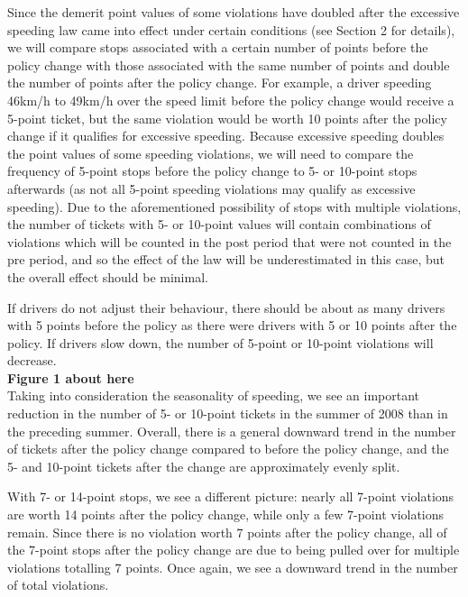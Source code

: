 Since the demerit point values of some violations have doubled after the excessive speeding law came into effect under certain conditions (see Section 2 for details), we will compare stops associated with a certain number of points before the policy change with those associated with the same number of points and double the number of points after the policy change. For example, a driver speeding 46km/h to 49km/h over the speed limit before the policy change would receive a 5-point ticket, but the same violation would be worth 10 points after the policy change if it qualifies for excessive speeding. Because excessive speeding doubles the point values of some speeding violations, we will need to compare the frequency of 5-point stops before the policy change to 5- or 10-point stops afterwards (as not all 5-point speeding violations may qualify as excessive speeding). Due to the aforementioned possibility of stops with multiple violations, the number of tickets with 5- or 10-point values will contain combinations of violations which will be counted in the post period that were not counted in the pre period, and so the effect of the law will be underestimated in this case, but the overall effect should be minimal.

If drivers do not adjust their behaviour, there should be about as many drivers with 5 points before the policy as there were drivers with 5 or 10 points after the policy. If drivers slow down, the number of 5-point or 10-point violations will decrease. \\

\textbf{Figure 1 about here} \\

Taking into consideration the seasonality of speeding, we see an important reduction in the number of 5- or 10-point tickets in the summer of 2008 than in the preceding summer. Overall, there is a general downward trend in the number of tickets after the policy change compared to before the policy change, and the 5- and 10-point tickets after the change are approximately evenly split. 

With 7- or 14-point stops, we see a different picture: nearly all 7-point violations are worth 14 points after the policy change, while only a few 7-point violations remain. Since there is no violation worth 7 points after the policy change, all of the 7-point stops after the policy change are due to being pulled over for multiple violations totalling 7 points. Once again, we see a downward trend in the number of total violations. \\


